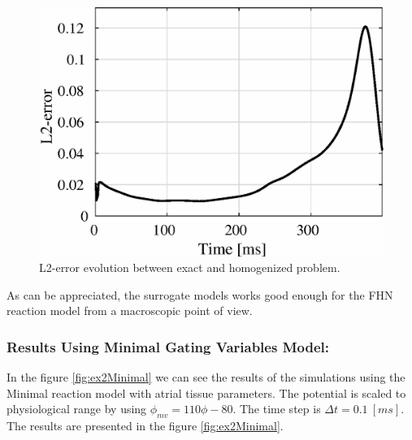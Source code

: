 \begin{figure}[H]
\centering
\includegraphics[height = 5 cm]{fig/Numerical_Experiments/ex2/FHN/error_L2}
\caption{L2-error evolution between exact and homogenized problem.} \label{fig:ex2_errorFHN}
\end{figure}

As can be appreciated, the surrogate models works good enough for the FHN reaction model from a macroscopic point of view.

\subsubsection{Results Using Minimal Gating Variables Model:}


In the figure \ref{fig:ex2Minimal} we can see the results of the simulations using the Minimal reaction model with atrial tissue parameters. The potential is scaled to physiological range by using $\phi_{mv} = 110 \phi - 80$. The time step is $\Delta t = 0.1~[ms]$. The results are presented in the figure \ref{fig:ex2Minimal}.


